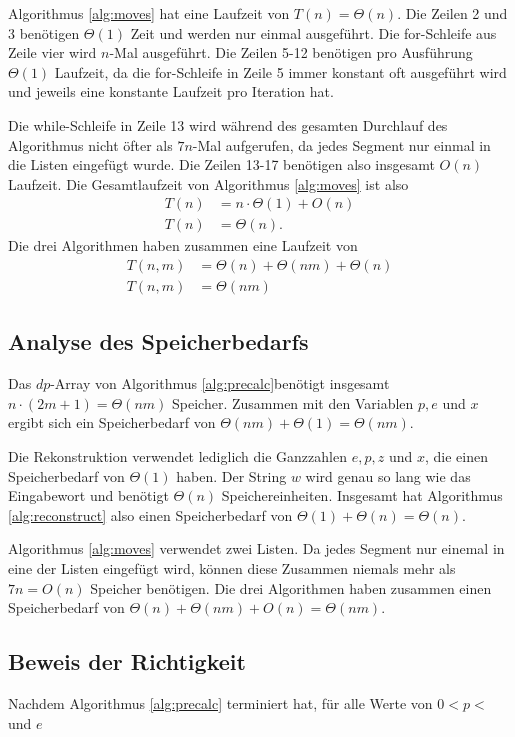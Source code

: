 \documentclass[a4paper,10pt,ngerman]{scrartcl}
\begin{document}
Algorithmus \ref{alg:moves} hat eine Laufzeit von $T(n) = \Theta(n)$. Die Zeilen 2 und 3 benötigen $\Theta(1)$ Zeit und werden nur einmal ausgeführt. 
Die for-Schleife aus Zeile vier wird $n$-Mal ausgeführt. 
Die Zeilen 5-12 benötigen pro Ausführung $\Theta(1)$ Laufzeit, da die for-Schleife in Zeile 5 immer konstant oft ausgeführt wird und jeweils eine konstante Laufzeit pro Iteration hat. 

Die while-Schleife in Zeile 13 wird während des gesamten Durchlauf des Algorithmus nicht öfter als $7n$-Mal aufgerufen, da jedes Segment nur einmal in die Listen eingefügt wurde. Die Zeilen 13-17 benötigen also insgesamt $O(n)$ Laufzeit.
Die Gesamtlaufzeit von Algorithmus \ref{alg:moves} ist also 
\begin{align*}
    T(n) &= n \cdot \Theta(1) + O(n)\\
    T(n) &= \Theta(n).
\end{align*}
Die drei Algorithmen haben zusammen eine Laufzeit von 
\begin{align*}
    T(n, m) &= \Theta(n) + \Theta(nm) + \Theta(n)\\
    T(n, m) &= \Theta(nm)
\end{align*}
\subsection{Analyse des Speicherbedarfs}
Das $dp$-Array von Algorithmus \ref{alg:precalc}benötigt insgesamt $n \cdot (2m + 1) = \Theta(nm)$ Speicher. Zusammen mit den Variablen $p, e$ und $x$ ergibt sich ein Speicherbedarf von $\Theta(nm) + \Theta(1) = \Theta(nm)$.

Die Rekonstruktion verwendet lediglich die Ganzzahlen $e, p, z$ und $x$, die einen Speicherbedarf von $\Theta(1)$ haben. Der String $w$ wird genau so lang wie das Eingabewort und benötigt $\Theta(n)$ Speichereinheiten. 
Insgesamt hat Algorithmus \ref{alg:reconstruct} also einen Speicherbedarf von $\Theta(1) + \Theta(n) = \Theta(n)$.

Algorithmus \ref{alg:moves} verwendet zwei Listen. Da jedes Segment nur einemal in eine der Listen eingefügt wird, können diese Zusammen niemals mehr als $7n = O(n)$ Speicher benötigen. 
Die drei Algorithmen haben zusammen einen Speicherbedarf von $\Theta(n) + \Theta(nm) + O(n)= \Theta(nm)$.
\subsection{Beweis der Richtigkeit}
Nachdem Algorithmus \ref{alg:precalc} terminiert hat, für alle Werte von $0 < p < $ und $e$ 
\end{document}
